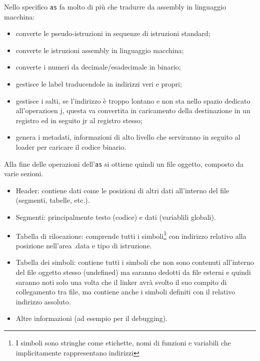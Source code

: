 \documentclass[class=book, crop=false, oneside]{standalone}
\begin{document}
Nello specifico \texttt{as} fa molto di più che tradurre da assembly in linguaggio macchina:
\begin{itemize}
	\item converte le pseudo-istruzioni in sequenze di istruzioni standard;
	\item converte le istruzioni assembly in linguaggio macchina;
	\item converte i numeri da decimale/esadecimale in binario;
	\item gestisce le label traducendole in indirizzi veri e propri;
	\item gestisce i salti, se l'indirizzo è troppo lontano e non sta nello spazio dedicato all'operazioen j, questa va convertita in caricamento della destinazione in un registro ed in seguito jr al registro stesso;
	\item genera i metadati, informazioni di alto livello che serviranno in seguito al loader per caricare il codice binario.
\end{itemize}

Alla fine delle operazioni dell'\texttt{as} si ottiene quindi un file oggetto, composto da varie sezioni.
\begin{itemize}
	\item Header: contiene dati come le posizioni di altri dati all'interno del file (segmenti, tabelle, etc.).
	\item Segmenti: principalmente testo (codice) e dati (variablili globali).
	\item Tabella di rilocazione: comprende tutti i simboli\footnote{I simboli sono stringhe come etichette, nomi di funzioni e variabili che implicitamente rappresentano indirizzi} con indirizzo relativo alla posizione nell'area .data e tipo di istruzione.
	\item Tabella dei simboli: contiene tutti i simboli che non sono contenuti all'interno del file oggetto stesso (undefined) ma saranno dedotti da file esterni e quindi saranno noti solo una volta che il linker avrà svolto il suo compito di collegamento tra file, ma contiene anche i simboli definiti con il relativo indirizzo assoluto.
	\item Altre informazioni (ad esempio per il debugging).
\end{itemize}
\end{document}
